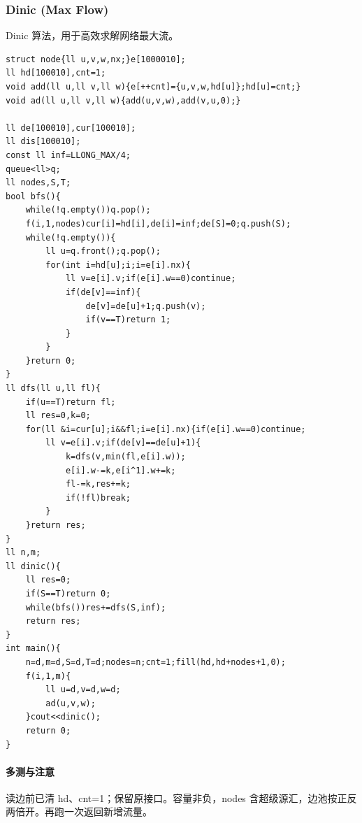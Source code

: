 \subsubsection{Dinic (Max Flow)}
Dinic 算法，用于高效求解网络最大流。
\begin{lstlisting}
struct node{ll u,v,w,nx;}e[1000010];
ll hd[100010],cnt=1;
void add(ll u,ll v,ll w){e[++cnt]={u,v,w,hd[u]};hd[u]=cnt;}
void ad(ll u,ll v,ll w){add(u,v,w),add(v,u,0);}

ll de[100010],cur[100010];
ll dis[100010];
const ll inf=LLONG_MAX/4;
queue<ll>q;
ll nodes,S,T;
bool bfs(){
    while(!q.empty())q.pop();
    f(i,1,nodes)cur[i]=hd[i],de[i]=inf;de[S]=0;q.push(S);
    while(!q.empty()){
        ll u=q.front();q.pop();
        for(int i=hd[u];i;i=e[i].nx){
            ll v=e[i].v;if(e[i].w==0)continue;
            if(de[v]==inf){
                de[v]=de[u]+1;q.push(v);
                if(v==T)return 1;
            }
        }
    }return 0;
}
ll dfs(ll u,ll fl){
    if(u==T)return fl;
    ll res=0,k=0;
    for(ll &i=cur[u];i&&fl;i=e[i].nx){if(e[i].w==0)continue;
        ll v=e[i].v;if(de[v]==de[u]+1){
            k=dfs(v,min(fl,e[i].w));
            e[i].w-=k,e[i^1].w+=k;
            fl-=k,res+=k;
            if(!fl)break;
        }
    }return res;
}
ll n,m;
ll dinic(){
    ll res=0;
    if(S==T)return 0;
    while(bfs())res+=dfs(S,inf);
    return res;
}
int main(){
    n=d,m=d,S=d,T=d;nodes=n;cnt=1;fill(hd,hd+nodes+1,0);
    f(i,1,m){
        ll u=d,v=d,w=d;
        ad(u,v,w);
    }cout<<dinic();
    return 0;
}
\end{lstlisting}

\paragraph{多测与注意} 读边前已清 hd、cnt=1；保留原接口。容量非负，nodes 含超级源汇，边池按正反两倍开。再跑一次返回新增流量。
